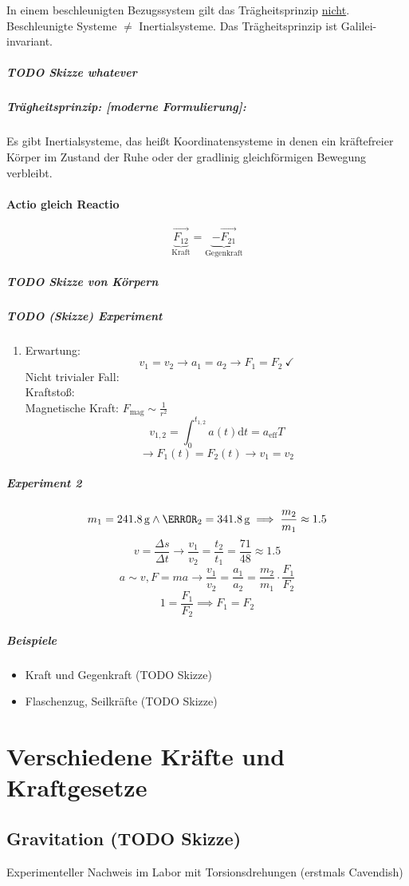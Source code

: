 \documentclass[a4paper]{scrartcl}
\renewcommand{\d}{\mathrm{d}}
\newcommand{\f}[2]{{\frac{#1}{#2}}}
\renewcommand{\v}[1]{\vec{#1}}
\theoremstyle{definition}
\theoremstyle{plain}
\theoremstyle{plain}
\theoremstyle{remark}
\theoremstyle{remark}
\theoremstyle{remark}
\begin{document}
In einem beschleunigten Bezugssystem gilt das Trägheitsprinzip \uline{nicht}. Beschleunigte Systeme $\neq$ Inertialsysteme.
Das Trägheitsprinzip ist Galilei-invariant.

\subparagraph{{\bfseries\sffamily TODO} Skizze whatever}
\label{sec-2-2-1-5-1}
\subparagraph{Trägheitsprinzip: [moderne Formulierung]:}
\label{sec-2-2-1-5-2}
Es gibt Inertialsysteme, das heißt Koordinatensysteme  in denen ein kräftefreier Körper im Zustand der Ruhe oder der gradlinig gleichförmigen Bewegung verbleibt.

\paragraph{Actio gleich Reactio}
\label{sec-2-2-1-6}
\[\underbrace{\v{F_{12}}}_{\text{Kraft}} = \underbrace{-\v{F_{21}}}_{\text{Gegenkraft}}\]
\subparagraph{{\bfseries\sffamily TODO} Skizze von Körpern}
\label{sec-2-2-1-6-1}
\subparagraph{{\bfseries\sffamily TODO} (Skizze) Experiment}
\label{sec-2-2-1-6-2}
\begin{enumerate}
\item Erwartung:
\label{sec-2-2-1-6-2-1}
\[v_1 = v_2 \rightarrow a_1 = a_2 \rightarrow F_1 = F_2~\checkmark\]
Nicht trivialer Fall: \\
           Kraftstoß: \\
           Magnetische Kraft: $F_{\text{mag}} \sim {\f{1}{r^2}}$
\[v_{1,2} = \int_0^{t_{1,2}} a(t)\d t = a_{\text{eff}}T\]
\[\rightarrow F_1(t) = F_2(t) \rightarrow v_1 = v_2\]
\end{enumerate}
\subparagraph{Experiment 2}
\label{sec-2-2-1-6-3}
\[m_1 = \SI{241.8}{\gram} \wedge \m_2 = \SI{341.8}{\gram} \implies \f{m_2}{m_1} \approx 1.5\]
\[v = \f{\Delta s}{\Delta t} \rightarrow \f{v_1}{v_2} = \f{t_2}{t_1} = \f{71}{48} \approx 1.5\]
\[a\sim v, F = m a \rightarrow \f{v_1}{v_2} = \f{a_1}{a_2} = \f{m_2}{m_1}\cdot \f{F_1}{F_2}\]
\[1 = \f{F_1}{F_2} \implies F_1 = F_2\]
\subparagraph{Beispiele}
\label{sec-2-2-1-6-4}
\begin{itemize}
\item Kraft und Gegenkraft (TODO Skizze)
\item Flaschenzug, Seilkräfte (TODO Skizze)
\end{itemize}
\section{Verschiedene Kräfte und Kraftgesetze}
\label{sec-3}
\subsection{Gravitation (TODO Skizze)}
\label{sec-3-1}
Experimenteller Nachweis im Labor mit Torsionsdrehungen (erstmals Cavendish)
\end{document}
